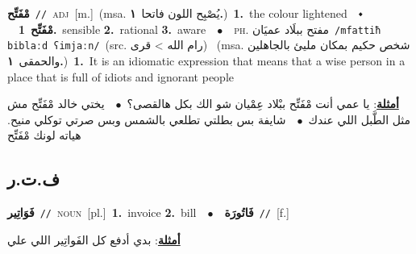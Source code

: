 \documentclass[10pt,a4paper,twoside]{article} %
\begin{document}
\begin{multicols}{2}
{{{{\setlength\topsep{0pt}\textbf{\foreignlanguage{arabic}{مْفَتِّح}}\ {\color{gray}\texttt{//}\color{black}}\ \textsc{adj}\ [m.]\ \color{gray}(msa. \foreignlanguage{arabic}{يُصْبِح اللون فاتحا}~\foreignlanguage{arabic}{\textbf{١.}})\color{black}\ \textbf{1.}~the colour lightened\ \ $\smblkdiamond$\ \ \setlength\topsep{0pt}\textbf{\foreignlanguage{arabic}{مْفَتِّح}}\ \textbf{1.}~sensible  \textbf{2.}~rational  \textbf{3.}~aware\ \ $\bullet$\ \ \textsc{ph.} \color{gray} \foreignlanguage{arabic}{مفتح ببلَاد عميَان}\color{black}\ {\color{gray}\texttt{/{\sffamily mfattiħ biblaːd ʕimjaːn}/}\color{black}}\ \color{gray}(src. \foreignlanguage{arabic}{رام الله > قرى})\color{black}\ \color{gray} (msa. \foreignlanguage{arabic}{شخص حكيم بمكان مليئ بالجاهلين والحمقى}~\foreignlanguage{arabic}{\textbf{١.}})\color{black}\ \textbf{1.}~It is an idiomatic expression that means that a wise person in a place that is full of idiots and ignorant people\  \begin{flushright}\color{gray}\foreignlanguage{arabic}{\textbf{\underline{\foreignlanguage{arabic}{أمثلة}}}: يا عمي أنت مْفَتِّح ببْلاد عِمْيان شو الك بكل هالقصى؟\ $\bullet$\ \  يختي خالد مْفَتِّح مش مثل الطَّبل اللي عندك\ $\bullet$\ \  شايفة بس بطلتي تطلعي بالشمس وبس صرتي توكلي منيح. هياته لونك مْفَتِّح}\end{flushright}\color{black}} \vspace{2mm}

\vspace{-3mm}
\subsection*{\color{blue}\foreignlanguage{arabic}{ف.ت.ر}\color{blue}{}} 

{\setlength\topsep{0pt}\textbf{\foreignlanguage{arabic}{فَوَاتِير}}\ {\color{gray}\texttt{//}\color{black}}\ \textsc{noun}\ [pl.]\ \textbf{1.}~invoice  \textbf{2.}~bill\ \ $\bullet$\ \ \setlength\topsep{0pt}\textbf{\foreignlanguage{arabic}{فَاتُورَة}}\ {\color{gray}\texttt{//}\color{black}}\ [f.]\  \begin{flushright}\color{gray}\foreignlanguage{arabic}{\textbf{\underline{\foreignlanguage{arabic}{أمثلة}}}: بدي أدفع كل الفَواتِير اللي علي}\end{flushright}\color{black}} \vspace{2mm}

}}}
\end{multicols}
\end{document}
